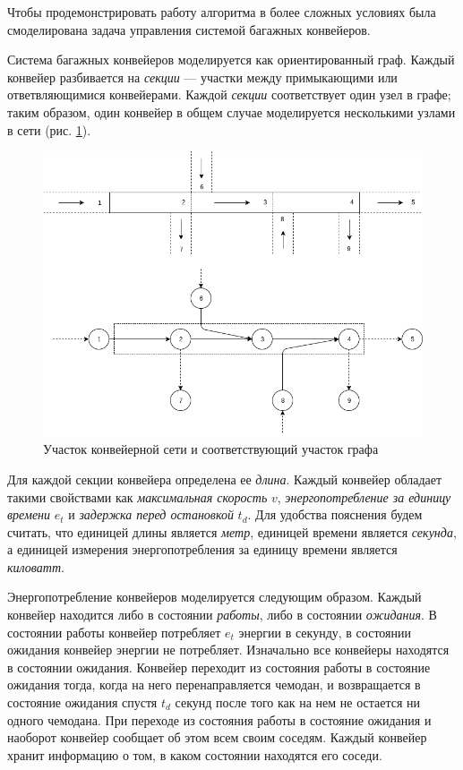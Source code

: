 \documentclass[specification, annotation]{itmo-student-thesis}
\begin{document}
Чтобы продемонстрировать работу алгоритма в более сложных условиях была
смоделирована задача управления системой багажных конвейеров.

Система багажных конвейеров моделируется как ориентированный граф. Каждый
конвейер разбивается на \textit{секции} --- участки между примыкающими или
ответвляющимися конвейерами. Каждой \textit{секции} соответствует один узел в
графе; таким образом, один конвейер в общем случае моделируется несколькими
узлами в сети (рис. \ref{conveyors-illustration}).

\begin{figure}[!h]
  \caption{Участок конвейерной сети и соответствующий участок
    графа}\label{conveyors-illustration}
  \centering
  \includegraphics[scale=0.6]{belt-illustration}
\end{figure}

Для каждой секции конвейера определена ее \textit{длина}. Каждый конвейер
обладает такими свойствами как \textit{максимальная скорость} $v$,
\textit{энергопотребление за единицу времени} $e_t$ и \textit{задержка перед
  остановкой} $t_d$. Для удобства пояснения будем считать, что единицей длины
является \textit{метр}, единицей времени является \textit{секунда}, а единицей
измерения энергопотребления за единицу времени является \textit{киловатт}.

Энергопотребление конвейеров моделируется следующим образом. Каждый конвейер
находится либо в состоянии \textit{работы}, либо в состоянии \textit{ожидания}.
В состоянии работы конвейер потребляет $e_t$ энергии в секунду, в состоянии
ожидания конвейер энергии не потребляет. Изначально все конвейеры находятся в
состоянии ожидания. Конвейер переходит из состояния работы в состояние ожидания
тогда, когда на него перенаправляется чемодан, и возвращается в состояние
ожидания спустя $t_d$ секунд после того как на нем не остается ни одного
чемодана. При переходе из состояния работы в состояние ожидания и наоборот
конвейер сообщает об этом всем своим соседям. Каждый конвейер хранит информацию
о том, в каком состоянии находятся его соседи.
\end{document}

